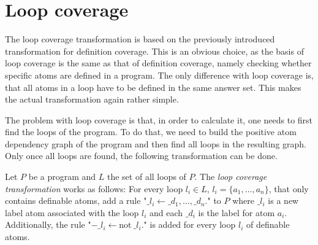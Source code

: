 \begin{comment}
    - $\_di$ label for every atom i     \/
    
    - if atom i is definable (it appears in the head of a rule, aka $Def(a_i)\neq\emptyset$) add new rule to program: $\_di :- \_rj$. for every rule j that defines atom i 
    (every rule j that has atom i in its head, aka every $r_j \in Def(a_i)$)    \/
    
    - example           \/
    
    - if one of the rules is covered (its body is true) then atom i is covered and $\_di$ will appear in the answer set     \/
    
    -> $\_di$ in answer set <=> atom i is positively covered    \/
    
    -> $\_di$ not in answer set <=> atom i is negatively covered (proof for these?)  \/
\end{comment}

\section{Loop coverage}
\label{sec:Computing coverage metrics for propositional programs/Loop coverage}
The loop coverage transformation is based on the previously introduced transformation for definition coverage. This is an obvious choice, as the basis of loop coverage is the same as that of definition coverage, namely checking whether specific atoms are defined in a program. The only difference with loop coverage is, that all atoms in a loop have to be defined in the same answer set. This makes the actual transformation again rather simple. 

The problem with loop coverage is that, in order to calculate it, one needs to first find the loops of the program. To do that, we need to build the positive atom dependency graph of the program and then find all loops in the resulting graph. Only once all loops are found, the following transformation can be done.

\begin{definition}
\label{def:loop transformation}
     Let $P$ be a program and $L$ the set of all loops of $P$. The \emph{loop coverage transformation} works as follows: For every loop \(l_i \in L\), \(l_i = \{a_1, \ldots, a_n\}\), that only contains definable atoms, add a rule "\(\_l_i \leftarrow \_d_1, \ldots, \_d_n.\)" to $P$ where $\_l_i$ is a new label atom associated with the loop $l_i$ and each $\_d_i$ is the label for atom $a_i$. Additionally, the rule "\(-\_l_i \leftarrow \text{not}\ \_l_i.\)" is added for every loop $l_i$ of definable atoms.
\end{definition}

